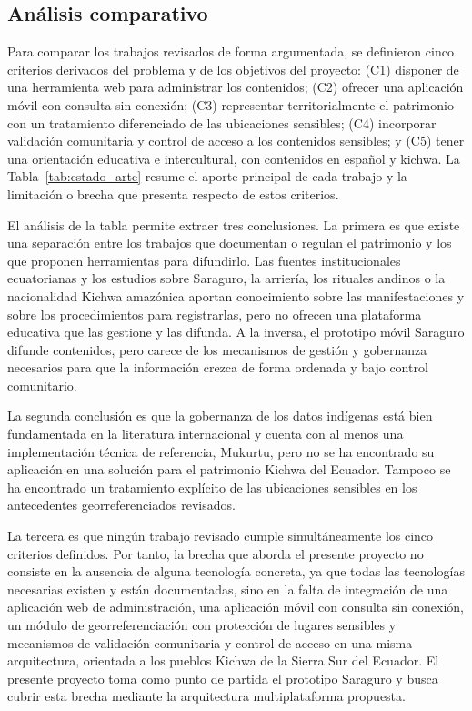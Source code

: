 \subsection{Análisis comparativo}
Para comparar los trabajos revisados de forma argumentada, se definieron cinco criterios derivados del problema y de los objetivos del proyecto: (C1) disponer de una herramienta web para administrar los contenidos; (C2) ofrecer una aplicación móvil con consulta sin conexión; (C3) representar territorialmente el patrimonio con un tratamiento diferenciado de las ubicaciones sensibles; (C4) incorporar validación comunitaria y control de acceso a los contenidos sensibles; y (C5) tener una orientación educativa e intercultural, con contenidos en español y kichwa. La Tabla~\ref{tab:estado_arte} resume el aporte principal de cada trabajo y la limitación o brecha que presenta respecto de estos criterios.

El análisis de la tabla permite extraer tres conclusiones. La primera es que existe una separación entre los trabajos que documentan o regulan el patrimonio y los que proponen herramientas para difundirlo. Las fuentes institucionales ecuatorianas y los estudios sobre Saraguro, la arriería, los rituales andinos o la nacionalidad Kichwa amazónica aportan conocimiento sobre las manifestaciones y sobre los procedimientos para registrarlas, pero no ofrecen una plataforma educativa que las gestione y las difunda. A la inversa, el prototipo móvil Saraguro difunde contenidos, pero carece de los mecanismos de gestión y gobernanza necesarios para que la información crezca de forma ordenada y bajo control comunitario.

La segunda conclusión es que la gobernanza de los datos indígenas está bien fundamentada en la literatura internacional y cuenta con al menos una implementación técnica de referencia, Mukurtu, pero no se ha encontrado su aplicación en una solución para el patrimonio Kichwa del Ecuador. Tampoco se ha encontrado un tratamiento explícito de las ubicaciones sensibles en los antecedentes georreferenciados revisados.

La tercera es que ningún trabajo revisado cumple simultáneamente los cinco criterios definidos. Por tanto, la brecha que aborda el presente proyecto no consiste en la ausencia de alguna tecnología concreta, ya que todas las tecnologías necesarias existen y están documentadas, sino en la falta de integración de una aplicación web de administración, una aplicación móvil con consulta sin conexión, un módulo de georreferenciación con protección de lugares sensibles y mecanismos de validación comunitaria y control de acceso en una misma arquitectura, orientada a los pueblos Kichwa de la Sierra Sur del Ecuador. El presente proyecto toma como punto de partida el prototipo Saraguro \cite{quezada2026mobile} y busca cubrir esta brecha mediante la arquitectura multiplataforma propuesta.

